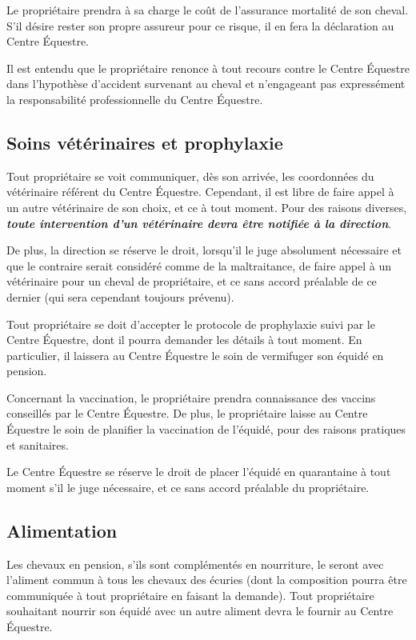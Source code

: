 \documentclass[11pt,a4paper]{article}
\renewcommand{\emph}[1]{\textit{\textbf{#1}}}
\begin{document}
Le propriétaire prendra à sa charge le coût de l'assurance mortalité de son cheval. S'il désire rester son propre assureur pour ce risque, il en fera la déclaration au Centre Équestre.

Il est entendu que le propriétaire renonce à tout recours contre le Centre Équestre dans l'hypothèse d'accident survenant au cheval et n'engageant pas expressément la responsabilité professionnelle du Centre Équestre.

\subsection*{Soins vétérinaires et prophylaxie}
Tout propriétaire se voit communiquer, dès son arrivée, les coordonnées du vétérinaire référent du Centre Équestre. Cependant, il est libre de faire appel à un autre vétérinaire de son choix, et ce à tout moment. Pour des raisons diverses, \emph{toute intervention d'un vétérinaire devra être notifiée à la direction}.

De plus, la direction se réserve le droit, lorsqu'il le juge absolument nécessaire et que le contraire serait considéré comme de la maltraitance, de faire appel à un vétérinaire pour un cheval de propriétaire, et ce sans accord préalable de ce dernier (qui sera cependant toujours prévenu).

Tout propriétaire se doit d'accepter le protocole de prophylaxie suivi par le Centre Équestre, dont il pourra demander les détails à tout moment. En particulier, il laissera au Centre Équestre le soin de vermifuger son équidé en pension.

Concernant la vaccination, le propriétaire prendra connaissance des vaccins conseillés par le Centre Équestre. De plus, le propriétaire laisse au Centre Équestre le soin de planifier la vaccination de l'équidé, pour des raisons pratiques et sanitaires.

Le Centre Équestre se réserve le droit de placer l'équidé en quarantaine à tout moment s'il le juge nécessaire, et ce sans accord préalable du propriétaire.

\subsection*{Alimentation}
Les chevaux en pension, s'ils sont complémentés en nourriture, le seront avec l'aliment commun à tous les chevaux des écuries (dont la composition pourra être communiquée à tout propriétaire en faisant la demande). Tout propriétaire souhaitant nourrir son équidé avec un autre aliment devra le fournir au Centre Équestre.
\end{document}
